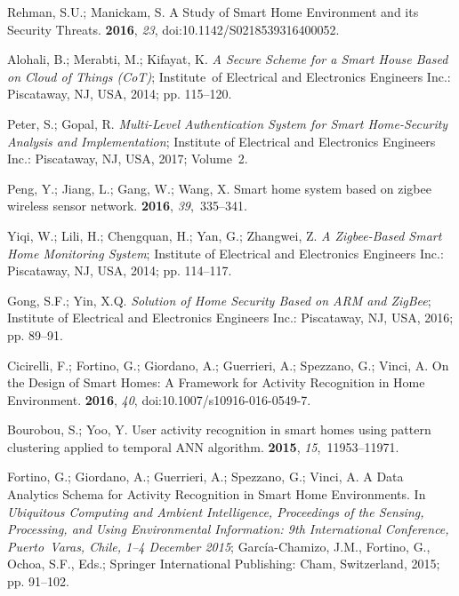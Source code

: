 \documentclass[symmetry,article,accept,moreauthors,pdftex10pt,a4paper]{mdpi}
\begin{document}
\begin{thebibliography}{999}
Rehman, S.U.; Manickam, S.
\newblock A Study of Smart Home Environment and its Security Threats.
 {\bf 2016}, {\em 23}, doi:10.1142/S0218539316400052.

Alohali, B.; Merabti, M.; Kifayat, K.
\newblock \emph{A Secure Scheme for a Smart House Based on Cloud of Things (CoT)};
\newblock Institute~of Electrical and Electronics Engineers Inc.: Piscataway, NJ, USA, 2014; pp.
115--120.

Peter, S.; Gopal, R.
\newblock \emph{Multi-Level Authentication System for Smart Home-Security Analysis
	and Implementation};
\newblock Institute of Electrical and Electronics Engineers Inc.: Piscataway, NJ, USA, 2017;
Volume~2.

Peng, Y.; Jiang, L.; Gang, W.; Wang, X.
\newblock Smart home system based on zigbee wireless sensor network.
 {\bf 2016}, {\em 39},~335--341.

Yiqi, W.; Lili, H.; Chengquan, H.; Yan, G.; Zhangwei, Z.
\newblock \emph{A Zigbee-Based Smart Home Monitoring System};
\newblock Institute of Electrical and Electronics Engineers Inc.: Piscataway, NJ, USA, 2014; pp.
114--117.

Gong, S.F.; Yin, X.Q.
\newblock \emph{Solution of Home Security Based on ARM and ZigBee};
\newblock Institute of Electrical and Electronics Engineers Inc.: Piscataway, NJ, USA, 2016; pp.
89--91.

Cicirelli, F.; Fortino, G.; Giordano, A.; Guerrieri, A.; Spezzano, G.; Vinci,
A.
\newblock On the Design of Smart Homes: A Framework for Activity Recognition in
Home Environment.
 {\bf 2016}, {\em 40}, doi:10.1007/s10916-016-0549-7.

Bourobou, S.; Yoo, Y.
\newblock User activity recognition in smart homes using pattern clustering
applied to temporal ANN algorithm.
 {\bf 2015}, {\em 15},~11953--11971.

Fortino, G.; Giordano, A.; Guerrieri, A.; Spezzano, G.; Vinci, A. A Data
Analytics Schema for Activity Recognition in Smart Home Environments.
\newblock In {\em Ubiquitous Computing and Ambient Intelligence, Proceedings of the Sensing,
	Processing, and Using Environmental Information: 9th International
	Conference, Puerto~Varas, Chile, 1--4 December 2015}; Garc{\'i}a-Chamizo, J.M., Fortino, G., Ochoa, S.F., Eds.;
Springer International Publishing: Cham, Switzerland, 2015; pp. 91--102.


\end{thebibliography}
\end{document}
